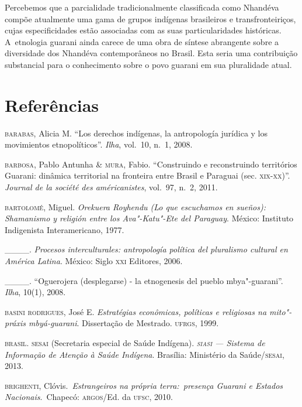

Percebemos que a parcialidade tradicionalmente classificada como
Nhandéva compõe atualmente uma gama de grupos indígenas brasileiros e
transfronteiriços, cujas especificidades estão associadas com as suas
particularidades históricas. A~etnologia guarani ainda carece de uma
obra de síntese abrangente sobre a diversidade dos Nhandéva
contemporâneos no Brasil. Esta seria uma
contribuição substancial para o conhecimento sobre o povo guarani em
sua pluralidade atual. 

\section{Referências}

\begin{Parskip}
\textsc{barabas}, Alicia M. ``Los derechos indígenas, la antropología jurídica y
los movimientos etnopolíticos''. \emph{Ilha}, vol.~10, n.~1, 2008.

\textsc{barbosa}, Pablo Antunha \& \textsc{mura}, Fabio. ``Construindo e reconstruindo
territórios Guarani: dinâmica territorial na fronteira entre Brasil e
Paraguai (sec. \textsc{xix}-\textsc{xx})''. \emph{Journal de la société des américanistes}, vol.~97, n.~2,
2011. 

\textsc{bartolomé}, Miguel. \emph{Orekuera Royhendu (Lo que escuchamos en
sueños): Shamanismo y religión entre los Ava"-Katu"-Ete del Paraguay}.
México: Instituto Indigenista Interamericano, 1977.

\_\_\_\_. \emph{Procesos interculturales: antropología política
del pluralismo cultural en América Latina}. México: Siglo \textsc{xxi} Editores,
2006.

\_\_\_\_. ``Oguerojera (desplegarse) - la etnogenesis del
pueblo mbya"-guarani''. \emph{Ilha}, 10(1), 2008.

\textsc{basini} \textsc{rodrigues}, José E. \emph{Estratégias econômicas, políticas e religiosas
na mito"-práxis mbyá-guarani}. Dissertação de Mestrado. \textsc{ufrgs}, 1999.

\textsc{brasil}. \textsc{sesai} (Secretaria especial de Saúde Indígena). \emph{\textsc{siasi} — Sistema
de Informação de Atenção à Saúde Indígena}. Brasília: Ministério da
Saúde/\textsc{sesai}, 2013.

\textsc{brighenti}, Clóvis.\emph{~Estrangeiros na própria terra:~presença
Guarani e Estados Nacionais}.~Chapecó: \textsc{argos}/Ed. da \textsc{ufsc}, 2010. 


\end{Parskip}
